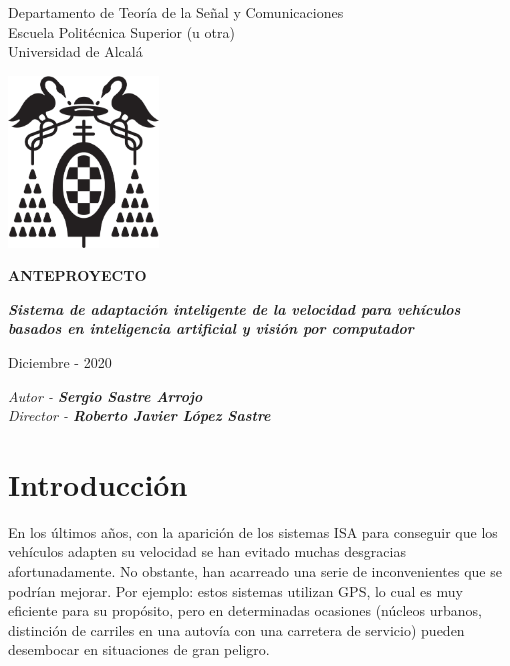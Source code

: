 \documentclass[12pt,oneside,a4paper]{article}
\begin{document}
\thispagestyle{empty}

\begin{center}


Departamento de Teoría de la Señal y Comunicaciones\\
Escuela Politécnica Superior (u otra)\\
Universidad de Alcalá\\

\vspace{1cm}

\includegraphics[width=4cm]{figuras/logo-uah.eps}

\textbf{ANTEPROYECTO}

\vspace{1cm}

\begin{large}\textbf{\textit{Sistema de adaptación inteligente de la velocidad para vehículos basados en inteligencia artificial y visión por computador}}\end{large}

\vfill

Diciembre - 2020

\end{center}

\begin{flushright}
\textit{Autor - \textbf{Sergio Sastre Arrojo}} \\
\textit{Director - \textbf{Roberto Javier López Sastre}}
\end{flushright}

\newpage

\section{Introducción}

En los últimos años, con la aparición de los sistemas ISA para conseguir que los vehículos adapten su velocidad se han evitado muchas desgracias afortunadamente. No obstante, han acarreado una serie de inconvenientes que se podrían mejorar. Por ejemplo: estos sistemas utilizan GPS, lo cual es muy eficiente para su propósito, pero en determinadas ocasiones (núcleos urbanos, distinción de carriles en una autovía con una carretera de servicio) pueden desembocar en situaciones de gran peligro.
\end{document}

